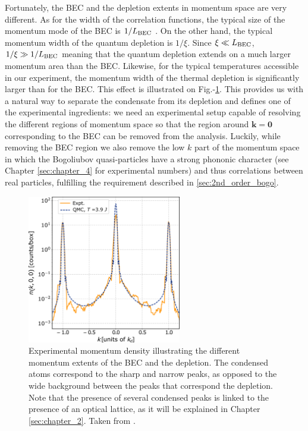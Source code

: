 Fortunately, the BEC and the depletion extents in momentum space are very different. As for the width of the correlation functions, the typical size of the momentum mode of the BEC is $1/L_{\rm{BEC}}$ \cite{stenger1999}. On the other hand, the typical momentum width of the quantum depletion is $1/\xi$. Since $\xi \ll L_{\rm{BEC}}$, $1/\xi \gg 1/L_{\rm{BEC}}$ meaning that the quantum depletion extends on a much larger momentum area than the BEC. Likewise, for the typical temperatures accessible in our experiment, the momentum width of the thermal depletion is significantly larger than for the BEC.
This effect is illustrated on Fig.-\ref{fig:density_lattice_ch1}. This provides us with a natural way to separate the condensate from its depletion and defines one of the experimental ingredients: we need an experimental setup capable of resolving the different regions of momentum space so that the region around $\bm{k}=\bm{0}$ corresponding to the BEC can be removed from the analysis. Luckily, while removing the BEC region we also remove the low $k$ part of the momentum space in which the Bogoliubov quasi-particles have a strong phononic character (see Chapter \ref{sec:chapter_4} for experimental numbers) and thus \kmk correlations between real particles, fulfilling the requirement described in \ref{sec:2nd_order_bogo}.



\begin{figure}
    \centering
    \includegraphics[width=0.6\textwidth]{Fig/Chapter1/cayla_2018.png}
    \caption[Illustration of the different momentum extents of the BEC and the depletion]{Experimental momentum density illustrating the different momentum extents of the BEC and the depletion. The condensed atoms correspond to the sharp and narrow peaks, as opposed to the wide background between the peaks that correspond the depletion. Note that the presence of several condensed peaks is linked to the presence of an optical lattice, as it will be explained in Chapter \ref{sec:chapter_2}. Taken from \cite{cayla2018single}.}
    \label{fig:density_lattice_ch1}
\end{figure}


